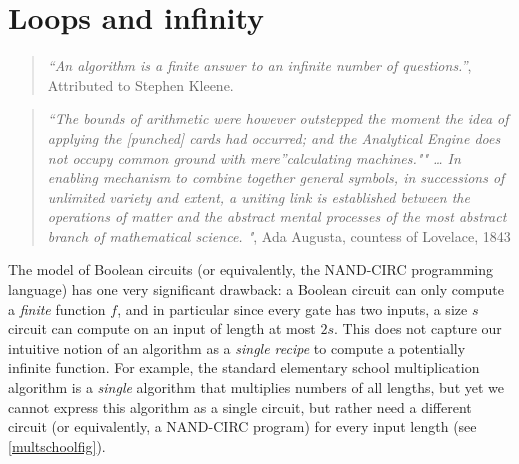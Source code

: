 \chapter{Loops and infinity}\label{chaploops}


\begin{quote}
\emph{``An algorithm is a finite answer to an infinite number of
questions.''}, Attributed to Stephen Kleene.
\end{quote}

\begin{quote}
\emph{``The bounds of arithmetic were however outstepped the moment the
idea of applying the {[}punched{]} cards had occurred; and the
Analytical Engine does not occupy common ground with mere''calculating
machines."" \ldots{} In enabling mechanism to combine together general
symbols, in successions of unlimited variety and extent, a uniting link
is established between the operations of matter and the abstract mental
processes of the most abstract branch of mathematical science. "}, Ada
Augusta, countess of Lovelace, 1843
\end{quote}

The model of Boolean circuits (or equivalently, the NAND-CIRC
programming language) has one very significant drawback: a Boolean
circuit can only compute a \emph{finite} function \(f\), and in
particular since every gate has two inputs, a size \(s\) circuit can
compute on an input of length at most \(2s\). This does not capture our
intuitive notion of an algorithm as a \emph{single recipe} to compute a
potentially infinite function. For example, the standard elementary
school multiplication algorithm is a \emph{single} algorithm that
multiplies numbers of all lengths, but yet we cannot express this
algorithm as a single circuit, but rather need a different circuit (or
equivalently, a NAND-CIRC program) for every input length (see
\cref{multschoolfig}).


